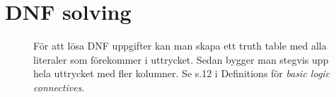 \documentclass[a5paper]{article}
\begin{document}
\section*{DNF solving}
\begin{figure}[ht]
	\centering
	\caption*{För att lösa DNF uppgifter kan man skapa ett truth table med alla literaler som förekommer i uttrycket.
		Sedan bygger man stegvis upp hela uttrycket med fler kolumner.
        Se s.12 i Definitions för \emph{basic logic connectives}.
	}\label{fig:2018-5-1}
\end{figure}
\end{document}
